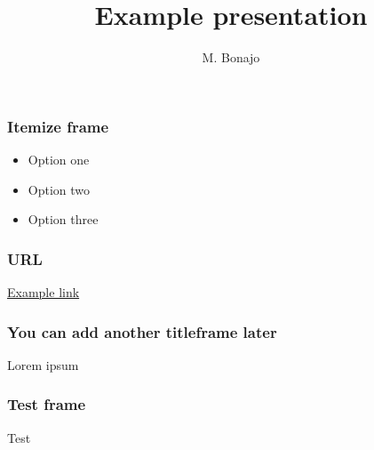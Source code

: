\documentclass[aspectratio=169]{beamer}
\title{Example presentation}
\institute{FHTenL}
\author{M. Bonajo}
\begin{document}
\begin{titleframe}
    \titlepage
\end{titleframe}

\begin{frame}
    \frametitle{Itemize frame}

    \begin{itemize}
        \item Option one
        \item Option two
        \item Option three
    \end{itemize}

\end{frame}

\begin{frame}
    \frametitle{URL}
    \href{http://www.example.com}{Example link}

\end{frame}

\begin{titleframe}
    \frametitle{You can add another titleframe later}
    Lorem ipsum
\end{titleframe}

\begin{frame}
    \frametitle{Test frame}

    Test

\end{frame}
\end{document}
